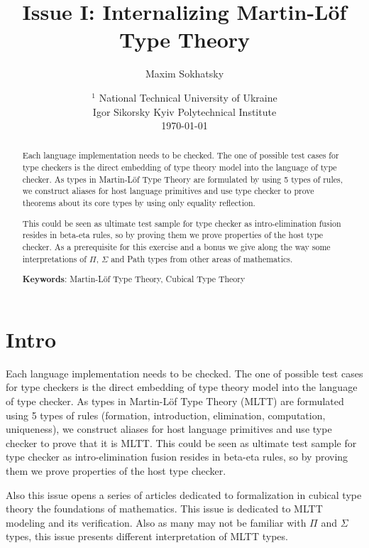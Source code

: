 \documentclass{article}
\theoremstyle{definition}
\begin{document}
\title{Issue I: Internalizing Martin-Löf Type Theory}
\author{Maxim Sokhatsky}
\date{ $^1$ National Technical University of Ukraine \\
       \small Igor Sikorsky Kyiv Polytechnical Institute \\
       \today }

\maketitle

\begin{abstract}
Each language implementation needs to be checked. The one of possible test cases
for type checkers is the direct embedding of type theory model into the language of type checker.
As types in Martin-Löf Type Theory are formulated by using 5 types of rules, we construct aliases
for host language primitives and use type checker to prove theorems about its core types by using only equality reflection.

This could be seen as ultimate test sample for type checker as
intro-elimination fusion resides in beta-eta rules, so by proving them
we prove properties of the host type checker. As a prerequisite for
this exercise and a bonus we give along the way some interpretations
of $\Pi$, $\Sigma$ and Path types from other areas of mathematics.

{\bf Keywords}: Martin-Löf Type Theory, Cubical Type Theory
\end{abstract}
\tableofcontents
\newpage

\section*{Intro}

Each language implementation needs to be checked. The one of possible test cases
for type checkers is the direct embedding of type theory model into the language of type checker.
As types in Martin-Löf Type Theory (MLTT) are formulated using 5 types of rules (formation,
introduction, elimination, computation, uniqueness), we construct aliases
for host language primitives and use type checker to prove that it is MLTT.
This could be seen as ultimate test sample for type checker as
intro-elimination fusion resides in beta-eta rules, so by proving them
we prove properties of the host type checker.

Also this issue opens a series of articles dedicated to formalization in
cubical type theory the foundations of mathematics. This issue is dedicated
to MLTT modeling and its verification. Also as many may not be familiar with
$\Pi$ and $\Sigma$ types, this issue presents different interpretation of MLTT types.
\end{document}
